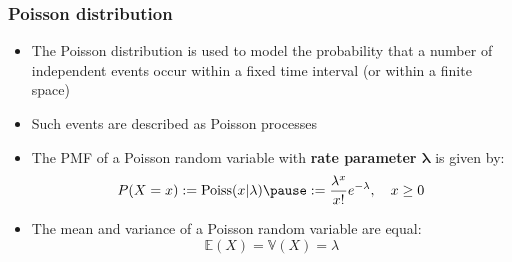 \documentclass[usenames,dvipsnames,smaller]{beamer}
\newcommand{\?}{\stackrel{?}{=}}
\newcommand{\fr}{\frac}
\newcommand{\rd}{\color{red}}
\newcommand{\la}{\lambda}
\begin{document}
\begin{frame}
  \frametitle{Poisson distribution} \pause
  \begin{itemize}[<+->]
  \item The Poisson distribution is used to model the probability that a number of independent events occur within a fixed time interval (or within a finite space)

  \item Such events are described as Poisson processes

  \item The PMF of a Poisson random variable with {\bf \rd rate parameter $\bm\la$} is given by:\pause
    \begin{equation}
      P(X=x) := \mathrm{Poiss}(x|\la) \pause := \fr{\la^{x}}{x!} e^{-\la}, \quad x \ge 0
    \end{equation}
    \pause

  \item The mean and variance of a Poisson random variable are equal:
    \begin{equation}
      \mathbb{E}(X) = \mathbb{V}(X) = \la
    \end{equation}


  \end{itemize}

  \pause

    \begin{center}
\end{center}
\end{frame}
\end{document}
